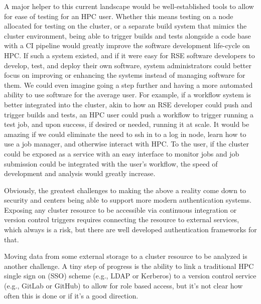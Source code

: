 A major helper to this current landscape would be well-established tools to allow for ease of testing for an HPC user. Whether this means testing on a node allocated for testing on the cluster, or a separate build system that mimics the cluster environment, being able to trigger builds and tests alongside a code base with a CI pipeline would greatly improve the software development life-cycle on HPC. If such a system existed, and if it were easy for RSE software developers to develop, test, and deploy their own software, system administrators could better focus on improving or enhancing the systems instead of managing software for them. We could even imagine going a step further and having a more automated ability to use software for the average user. For example, if a workflow system is better integrated into the cluster, akin to how an RSE developer could push and trigger builds and tests, an HPC user could push a workflow to trigger running a test job, and upon success, if desired or needed, running it at scale. It would be amazing if we could eliminate the need to ssh in to a log in node, learn how to use a job manager, and otherwise interact with HPC. To the user, if the cluster could be exposed as a service with an easy interface to monitor jobs and job submission could be integrated with the user's workflow, the speed of development and analysis would greatly increase.

Obviously, the greatest challenges to making the above a reality come down to security and centers being able to support more modern authentication systems. Exposing any cluster resource to be accessible via continuous integration or version control triggers requires connecting the resource to external services, which always is a risk, but there are well developed authentication frameworks for that.


Moving data from some external storage to a cluster resource to be analyzed is another challenge. A tiny step of progress is the ability to link a traditional HPC single sign on (SSO) scheme (e.g., LDAP or Kerberos) to a version control service (e.g., GitLab or GitHub) to allow for role based access, but it's not clear how often this is done or if it's a good direction.
